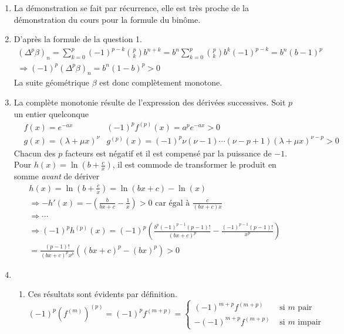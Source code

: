 \begin{enumerate}
 \item La démonstration se fait par récurrence, elle est très proche de la démonstration du cours pour la formule du binôme. 

 \item D'après la formule de la question 1.
\begin{multline*}
 (\Delta ^p \beta)_n =
\sum_{k=0}^p (-1)^{p-k}\binom{p}{k}b^{n+k}
= b^n \sum_{k=0}^p \binom{p}{k}b^{k}(-1)^{p-k}
= b^n (b-1)^p \\
\Rightarrow 
(-1)^p(\Delta ^p \beta)_n =b^n(1-b)^p>0
\end{multline*}
La suite géométrique $\beta$ est donc complètement monotone.

 \item La complète monotonie résulte de l'expression des dérivées successives. Soit $p$ un entier quelconque
\begin{align*}
 &f(x)=e^{-ax} & (-1)^pf^{(p)}(x)=a^pe^{-ax}>0\\
&g(x)= (\lambda + \mu x)^\nu &  g^{(p)}(x)=(-1)^p\nu(\nu-1)\cdots (\nu -p +1)(\lambda + \mu x)^{\nu-p}>0
\end{align*}
Chacun des $p$ facteurs est négatif et il est compensé par la puissance de $-1$.
Pour $h(x)=\ln(b+\frac{c}{x})$, il est commode de transformer le produit en somme \emph{avant} de dériver
\begin{multline*}
h(x)=\ln(b+\frac{c}{x}) = \ln(bx+c) -\ln(x) \\
\Rightarrow -h'(x) = -\left( \frac{b}{bx+c} - \frac{1}{x}\right)  >0\text{ car égal à }\frac{c}{(bx+c)x}\\
\Rightarrow \cdots \\
\Rightarrow (-1)^ph^{(p)}(x) = (-1)^p\left( \frac{b^p(-1)^{p-1}(p-1)!}{(bx+c)^{p}} -\frac{(-1)^{p-1}(p-1)!}{x^p}\right) \\
= \frac{(p-1)!}{(bx+c)^px^p}\left( (bx+c)^p -(bx)^p\right) >0
\end{multline*}

 \item 
\begin{enumerate}
 \item Ces résultats sont évidents par définition.
\begin{displaymath}
 (-1)^p(f^{(m)})^{(p)}=(-1)^p f^{(m+p)}=
\left\lbrace 
\begin{aligned}
 (-1)^{m+p} f^{(m+p)}&\text{ si } m \text{ pair}\\
 -(-1)^{m+p} f^{(m+p)}&\text{ si } m \text{ impair}
\end{aligned}
\right. 
\end{displaymath}


\end{enumerate}
\end{enumerate}

